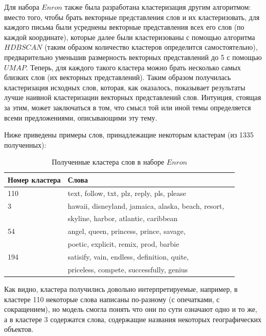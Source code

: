 Для набора $Enron$ также была разработана кластеризация другим алгоритмом:
вместо того, чтобы брать векторные представления слов и их кластеризовать, для каждого письма были усреднены векторные представления всех его слов (по каждой координате), которые далее были кластеризованы с помощью алгоритма $HDBSCAN$ (таким образом количество кластеров определится самостоятельно), предварительно уменьшив размерность векторных представлений
до 5 с помощью $UMAP$. Теперь, для каждого такого кластера можно брать несколько самых близких слов (их векторных представлений). Таким образом получилась кластеризация исходных слов, которая, как оказалось, показывает результаты лучше наивной кластеризации векторных представлений слов. Интуиция, стоящая за этим, может заключаться в том, что смысл той или иной темы определяется всеми предложениями, описывающими эту тему.

Ниже приведены примеры слов, принадлежащие некоторым кластерам (из 1335 полученных):

\begin{table}[H]
\centering
\begin{tabular}{ | l | l | l | }
\hline
Номер кластера & Слова \\ \hline
110 & text, follow, txt, plz, reply, pls, please \\ \hline
3 & hawaii, disneyland, jamaica, alaska, beach, resort,
\\ & skyline, harbor, atlantic, caribbean \\ \hline
54 & angel, queen, princess, prince, savage,
\\ & poetic, explicit, remix, prod, barbie \\ \hline
194 & satisify, vain, endless, definition, quite,
\\ & priceless, compete, successfully, genius \\ \hline
\end{tabular}
\caption{Полученные кластера слов в наборе $Enron$}
\end{table}

Как видно, кластера получились довольно интерпретируемые, например, в кластере 110
некоторые слова написаны по-разному (с опечатками, с сокращением), но модель смогла понять что они по сути означают одно и то же, а в кластере 3 содержатся слова, содержащие названия некоторых географических объектов.
